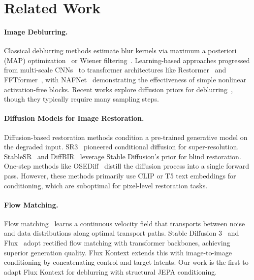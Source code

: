 \documentclass{article}
\begin{document}
\section{Related Work}
\label{sec:related}

\paragraph{Image Deblurring.}
Classical deblurring methods estimate blur kernels via maximum a posteriori (MAP) optimization~\cite{fergus2006removing, cho2009fast} or Wiener filtering~\cite{wiener1949extrapolation}. Learning-based approaches progressed from multi-scale CNNs~\cite{nah2017deep, tao2018scale} to transformer architectures like Restormer~\cite{zamir2022restormer} and FFTformer~\cite{kong2023efficient}, with NAFNet~\cite{chen2022nafnet} demonstrating the effectiveness of simple nonlinear activation-free blocks. Recent works explore diffusion priors for deblurring~\cite{ren2023multiscale, whang2022deblurring}, though they typically require many sampling steps.

\paragraph{Diffusion Models for Image Restoration.}
Diffusion-based restoration methods condition a pre-trained generative model on the degraded input. SR3~\cite{saharia2022image} pioneered conditional diffusion for super-resolution. StableSR~\cite{wang2024exploiting} and DiffBIR~\cite{lin2023diffbir} leverage Stable Diffusion's prior for blind restoration. One-step methods like OSEDiff~\cite{wu2024osediff} distill the diffusion process into a single forward pass. However, these methods primarily use CLIP or T5 text embeddings for conditioning, which are suboptimal for pixel-level restoration tasks.

\paragraph{Flow Matching.}
Flow matching~\cite{lipman2023flow, liu2023flow} learns a continuous velocity field that transports between noise and data distributions along optimal transport paths. Stable Diffusion 3~\cite{esser2024scaling} and Flux~\cite{flux2024} adopt rectified flow matching with transformer backbones, achieving superior generation quality. Flux Kontext extends this with image-to-image conditioning by concatenating control and target latents. Our work is the first to adapt Flux Kontext for deblurring with structural JEPA conditioning.
\end{document}
